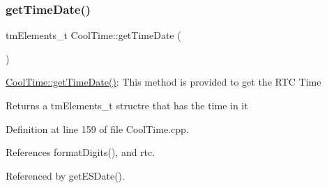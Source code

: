 \subsubsection{\texorpdfstring{get\+Time\+Date()}{getTimeDate()}}
{\footnotesize\ttfamily tm\+Elements\+\_\+t Cool\+Time\+::get\+Time\+Date (\begin{DoxyParamCaption}{ }\end{DoxyParamCaption})}

\hyperlink{classCoolTime_a7a7501c5ca77dd1248bea704c44f986c}{Cool\+Time\+::get\+Time\+Date()}\+: This method is provided to get the R\+TC Time

\begin{DoxyReturn}{Returns}
a tm\+Elements\+\_\+t structre that has the time in it 
\end{DoxyReturn}


Definition at line 159 of file Cool\+Time.\+cpp.



References format\+Digits(), and rtc.



Referenced by get\+E\+S\+Date().


